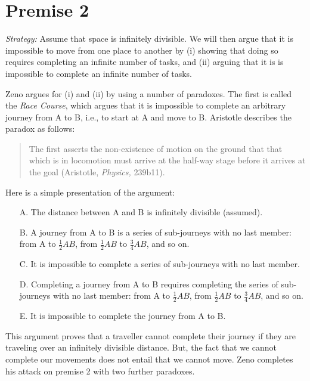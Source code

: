 \documentclass[oneside]{article}
\begin{document}
\section{Premise 2}\label{premise-2}


\emph{Strategy:} Assume that space is infinitely divisible. We will then argue
that it is impossible to move from one place to another by (i) showing that doing so requires completing an infinite number of tasks, and (ii) arguing that it is
is impossible to complete an infinite number of tasks.

Zeno argues for (i) and (ii) by using a number of paradoxes. The first is
called the \emph{Race Course}, which argues that it is impossible to complete
an arbitrary journey from A to B, i.e., to start at A and move to B. Aristotle describes the paradox as follows:

\begin{quote}
The first asserts the non-existence of motion on the ground that that
which is in locomotion must arrive at the half-way stage before it
arrives at the goal (Aristotle, \emph{Physics,} 239b11).
\end{quote}
Here is a simple presentation of the argument: 
\begin{enumerate}
\item[A.]  The distance between A and B is infinitely divisible (assumed).
\item[B.]  A journey from A to B is a series of sub-journeys with no last member:
  from A to \(\frac{1}{2}AB\), from \(\frac{1}{2}AB\) to
  \(\frac{3}{4}AB\), and so on.
\item[C.]  It is impossible to complete a series of sub-journeys with no last
  member.
\item[D.]  Completing a journey from A to B requires completing the series of
  sub-journeys with no last member: from A to \(\frac{1}{2}AB\), from
  \(\frac{1}{2}AB\) to \(\frac{3}{4}AB\), and so on.
\item[E.]  It is impossible to complete the journey from A to B.
\end{enumerate}
This argument proves that a traveller cannot complete their journey if they are traveling over an infinitely divisible distance. But, the fact that we cannot complete our movements does not entail  that we cannot move. Zeno completes his attack on premise 2 with two further paradoxes. 
\end{document}
